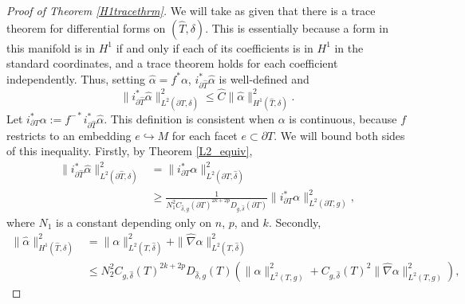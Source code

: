 \documentclass[11pt]{article}
\begin{document}
\begin{proof}[Proof of Theorem \ref{H1tracethrm}]
We will take as given that there is a trace theorem for differential forms on $(\hat T, \delta)$. This is essentially because a form in this manifold is in $H^1$ if and only if each of its coefficients is in $H^1$ in the standard coordinates, and a trace theorem holds for each coefficient independently. Thus, setting $\hat \alpha = f^*\alpha$, $i_{\partial \hat T}^* \hat \alpha$ is well-defined and
\begin{equation}\label{basictraceeqn}
\|i_{\partial \hat T}^*\hat \alpha\|^2_{L^2(\partial \hat T,\delta)} \le \hat C \|\hat \alpha\|^2_{H^1(\hat T, \delta)}.
\end{equation}
Let $i_{\partial T}^*\alpha := f^{-*}i_{\partial \hat T}^*\hat \alpha$. This definition is consistent when $\alpha$ is continuous, because $f$ restricts to an embedding $e \hookrightarrow M$ for each facet $e \subset \partial T$. We will bound both sides of this inequality. Firstly, by Theorem \ref{L2_equiv},
\begin{align*}
\|i_{\partial \hat T}^*\hat\alpha\|^2_{L^2(\partial \hat T,\delta)} &= \|i_{\partial T}^*\alpha\|_{L^2(\partial T,\hat \delta)}^2 \\
&\ge \frac{1}{N_1^2C_{\hat \delta,g}(\partial T)^{2k + 2p}D_{g,\hat \delta}(\partial T)}\|i_{\partial T}^*\alpha\|_{L^2(\partial T,g)}^2,
\end{align*}
where $N_1$ is a constant depending only on $n$, $p$, and $k$.
Secondly,
\begin{align*}
\|\hat{\alpha}\|^2_{H^1(\hat T, \delta)} &= \|\alpha\|^2_{L^2(T,\hat \delta)} + \|\hat\nabla\alpha\|^2_{L^2(T,\hat \delta)}\\
&\le N_2^2C_{g,\hat \delta}(T)^{2k + 2p}D_{\hat \delta,g}(T)\left(\|\alpha\|_{L^2(T,g)}^2 + C_{g,\hat \delta}(T)^2\|\hat\nabla\alpha\|_{L^2(T,g)}^2\right),

\end{align*}
\end{proof}
\end{document}
